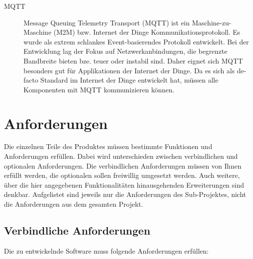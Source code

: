 \documentclass[fontsize=11pt,a4paper]{scrartcl}
\begin{document}
\begin{description}
\item[MQTT]
Message Queuing Telemetry Transport (MQTT) ist ein Maschine-zu-Maschine (M2M) bzw. Internet der Dinge Kommunikationsprotokoll.
Es wurde als extrem schlankes Event-basierendes Protokoll entwickelt.
Bei der Entwicklung lag der Fokus auf Netzwerkanbindungen, die begrenzte Bandbreite bieten bze. teuer oder instabil sind.
Daher eignet sich MQTT besonders gut für Applikationen der Internet der Dinge.
Da es sich als de-facto Standard im Internet der Dinge entwickelt hat, müssen alle Komponenten mit MQTT kommunizieren können.
\end{description}

\section{Anforderungen}

Die einzelnen Teile des Produktes müssen bestimmte Funktionen und Anforderungen erfüllen.
Dabei wird unterschieden zwischen verbindlichen und optionalen Anforderungen.
Die verbindlichen Anforderungen müssen von Ihnen erfüllt werden, die optionalen sollen freiwillig umgesetzt werden.
Auch weitere, über die hier angegebenen Funktionalitäten hinausgehenden Erweiterungen sind denkbar.
Aufgelistet sind jeweils nur die Anforderungen des Sub-Projektes, nicht die Anforderungen aus dem gesamten Projekt.

\subsection{Verbindliche Anforderungen}

Die zu entwickelnde Software muss folgende Anforderungen erfüllen:
\end{document}
